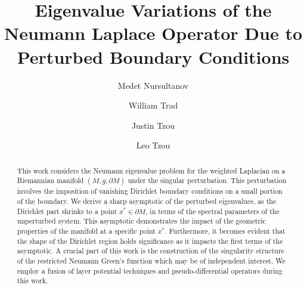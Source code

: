 \documentclass[12pt,a4paper]{amsart}
\numberwithin{equation}{section}
\theoremstyle{plain}
\theoremstyle{definition}
\begin{document}
	
	\title[Eigenvalue Variations]{Eigenvalue Variations of the Neumann Laplace Operator Due to Perturbed Boundary Conditions}
	
	
	\author[M. Nursultanov]{Medet Nursultanov}
	\address {Department of Mathematics and Statistics, University of Helsinki}
	
	
	\author[W. Trad] {William Trad}
	\address {School of Mathematics and Statistics, University of Sydney}
	
	\author[J. Tzou] {Justin Tzou}
	\address {School of Mathematical and Physical Science, Macquarie University}
	
	\author[L. Tzou] {Leo Tzou}
	\address {University of Amsterdam}
	
	
	
	
	
	
	
	
	
	
	\begin{abstract}
		This work considers the Neumann eigenvalue problem for the weighted Laplacian on a Riemannian manifold $(M,g,\partial M)$ under the singular perturbation. This perturbation involves the imposition of vanishing Dirichlet boundary conditions on a small portion of the boundary. We derive a sharp asymptotic of the perturbed eigenvalues, as the Dirichlet part shrinks to a point $x^*\in \partial M$, in terms of the spectral parameters of the unperturbed system. This asymptotic demonstrates the impact of the geometric properties of the manifold at a specific point $x^*$. Furthermore, it becomes evident that the shape of the Dirichlet region holds significance as it impacts the first terms of the asymptotic. A crucial part of this work is the construction of the singularity structure of the restricted Neumann Green's function which may be of independent interest. We employ a fusion of layer potential techniques and pseudo-differential operators during this work.
	\end{abstract}
 
	\maketitle
	
	
	
\end{document}
